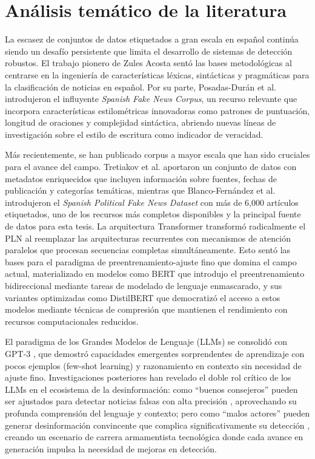 \section{Análisis temático de la literatura}
\label{sec:analisis_tematico}

La escasez de conjuntos de datos etiquetados a gran escala en español continúa siendo un desafío persistente que limita el desarrollo de sistemas de detección robustos. El trabajo pionero de Zules Acosta \cite{acosta2019construccion} sentó las bases metodológicas al centrarse en la ingeniería de características léxicas, sintácticas y pragmáticas para la clasificación de noticias en español. Por su parte, Posadas-Durán et al. \cite{posadas2019detection} introdujeron el influyente \textit{Spanish Fake News Corpus}, un recurso relevante que incorpora características estilométricas innovadoras como patrones de puntuación, longitud de oraciones y complejidad sintáctica, abriendo nuevas líneas de investigación sobre el estilo de escritura como indicador de veracidad.

Más recientemente, se han publicado corpus a mayor escala que han sido cruciales para el avance del campo. Tretiakov et al. \cite{tretiakov2022detection} aportaron un conjunto de datos con metadatos enriquecidos que incluyen información sobre fuentes, fechas de publicación y categorías temáticas, mientras que Blanco-Fernández et al. \cite{blanco2024enhancing} introdujeron el \textit{Spanish Political Fake News Dataset} con más de 6,000 artículos etiquetados, uno de los recursos más completos disponibles y la principal fuente de datos para esta tesis. La arquitectura Transformer \cite{vaswani2017attention} transformó radicalmente el PLN al reemplazar las arquitecturas recurrentes con mecanismos de atención paralelos que procesan secuencias completas simultáneamente. Esto sentó las bases para el paradigma de preentrenamiento-ajuste fino que domina el campo actual, materializado en modelos como BERT \cite{devlin2018bert} que introdujo el preentrenamiento bidireccional mediante tareas de modelado de lenguaje enmascarado, y sus variantes optimizadas como DistilBERT \cite{sanh2019distilbert} que democratizó el acceso a estos modelos mediante técnicas de compresión que mantienen el rendimiento con recursos computacionales reducidos.

El paradigma de los Grandes Modelos de Lenguaje (LLMs) se consolidó con GPT-3 \cite{brown2020language}, que demostró capacidades emergentes sorprendentes de aprendizaje con pocos ejemplos (few-shot learning) y razonamiento en contexto sin necesidad de ajuste fino. Investigaciones posteriores han revelado el doble rol crítico de los LLMs en el ecosistema de la desinformación: como ``buenos consejeros'' pueden ser ajustados para detectar noticias falsas con alta precisión \cite{hu2024bad}, aprovechando su profunda comprensión del lenguaje y contexto; pero como ``malos actores'' pueden generar desinformación convincente que complica significativamente su detección \cite{su2023adapting}, creando un escenario de carrera armamentista tecnológica donde cada avance en generación impulsa la necesidad de mejoras en detección.

